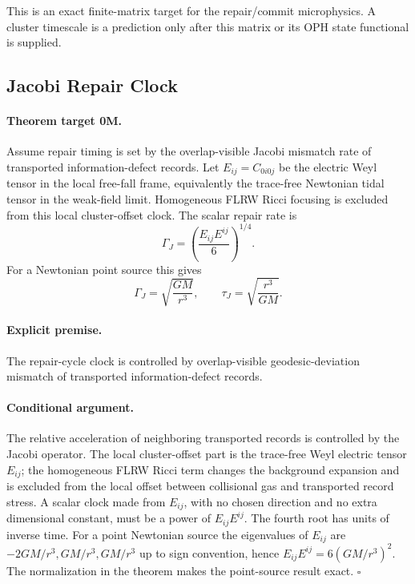 \documentclass[11pt]{article}
\begin{document}
This is an exact finite-matrix target for the repair/commit microphysics.  A
cluster timescale is a prediction only after this matrix or its OPH state
functional is supplied.

\subsection{Jacobi Repair Clock}

\paragraph{Theorem target 0M.}
Assume repair timing is set by the overlap-visible Jacobi mismatch rate of
transported information-defect records.  Let \(E_{ij}=C_{0i0j}\) be the
electric Weyl tensor in the local free-fall frame, equivalently the trace-free
Newtonian tidal tensor in the weak-field limit.  Homogeneous FLRW Ricci
focusing is excluded from this local cluster-offset clock.  The scalar repair
rate is
\begin{equation}
  \Gamma_J
  =
  \left(\frac{E_{ij}E^{ij}}{6}\right)^{1/4}.
\end{equation}
For a Newtonian point source this gives
\begin{equation}
  \Gamma_J=\sqrt{\frac{GM}{r^3}},
  \qquad
  \tau_J=\sqrt{\frac{r^3}{GM}}.
\end{equation}

\paragraph{Explicit premise.}
The repair-cycle clock is controlled by overlap-visible geodesic-deviation
mismatch of transported information-defect records.

\paragraph{Conditional argument.}
The relative acceleration of neighboring transported records is controlled by
the Jacobi operator.  The local cluster-offset part is the trace-free Weyl
electric tensor \(E_{ij}\); the homogeneous FLRW Ricci term changes the
background expansion and is excluded from the local offset between collisional
gas and transported record stress.  A scalar clock made from \(E_{ij}\), with no
chosen direction and no extra dimensional constant, must be a power of
\(E_{ij}E^{ij}\).  The fourth root has units of inverse time.  For a point
Newtonian source the eigenvalues of \(E_{ij}\) are
\(-2GM/r^3,GM/r^3,GM/r^3\) up to sign convention, hence
\(E_{ij}E^{ij}=6(GM/r^3)^2\).  The normalization in the theorem makes the
point-source result exact. \(\square\)
\end{document}

